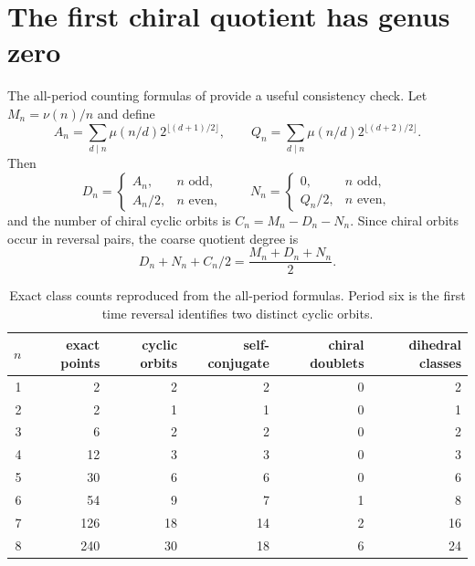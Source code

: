 \section{The first chiral quotient has genus zero}\label{sec:period6}

The all-period counting formulas of \citet{gallas2007} provide a useful
consistency check.  Let $M_n=\nu(n)/n$ and define
\begin{equation}
A_n=\sum_{d\mid n}\mu(n/d)2^{\lfloor(d+1)/2\rfloor},\qquad
Q_n=\sum_{d\mid n}\mu(n/d)2^{\lfloor(d+2)/2\rfloor}.
\end{equation}
Then
\begin{equation}
D_n=\begin{cases}A_n,&n\text{ odd},\\A_n/2,&n\text{ even},\end{cases}
\qquad
N_n=\begin{cases}0,&n\text{ odd},\\Q_n/2,&n\text{ even},\end{cases}
\end{equation}
and the number of chiral cyclic orbits is $C_n=M_n-D_n-N_n$.
Since chiral orbits occur in reversal pairs, the coarse quotient degree is
\begin{equation}\label{eq:burnside-degree}
D_n+N_n+C_n/2=\frac{M_n+D_n+N_n}{2}.
\end{equation}

\begin{table}[t]
\centering
\small
\begin{tabular}{rrrrrr}
\toprule
$n$ & exact points & cyclic orbits & self-conjugate & chiral doublets & dihedral classes \\
\midrule
1 & 2 & 2 & 2 & 0 & 2 \\
2 & 2 & 1 & 1 & 0 & 1 \\
3 & 6 & 2 & 2 & 0 & 2 \\
4 & 12 & 3 & 3 & 0 & 3 \\
5 & 30 & 6 & 6 & 0 & 6 \\
6 & 54 & 9 & 7 & 1 & 8 \\
7 & 126 & 18 & 14 & 2 & 16 \\
8 & 240 & 30 & 18 & 6 & 24 \\
\bottomrule
\end{tabular}
\caption{Exact class counts reproduced from the all-period formulas.  Period
six is the first time reversal identifies two distinct cyclic orbits.}
\label{tab:counts}
\end{table}

